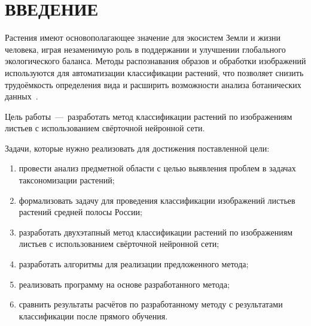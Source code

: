 \chapter*{ВВЕДЕНИЕ}

Растения имеют основополагающее значение для экосистем Земли и жизни человека, играя незаменимую роль в поддержании и улучшении глобального экологического баланса. Методы распознавания образов и обработки изображений используются для автоматизации классификации растений, что позволяет снизить трудоёмкость определения вида и расширить возможности анализа ботанических данных~\cite{ref1101}.

Цель работы~---~разработать метод классификации растений по изображениям листьев с использованием свёрточной нейронной сети.

Задачи, которые нужно реализовать для достижения поставленной цели:
\begin{enumerate}[itemsep=0pt, parsep=0pt, topsep=0pt]
	\item провести анализ предметной области с целью выявления проблем в задачах таксономизации растений;
	\item формализовать задачу для проведения классификации изображений листьев растений средней полосы России;
	\item разработать двухэтапный метод классификации растений по изображениям листьев с использованием свёрточной нейронной сети;
	\item разработать алгоритмы для реализации предложенного метода;
	\item реализовать программу на основе разработанного метода;
	\item сравнить результаты расчётов по разработанному методу с результатами классификации после прямого обучения.
\end{enumerate}

\clearpage

